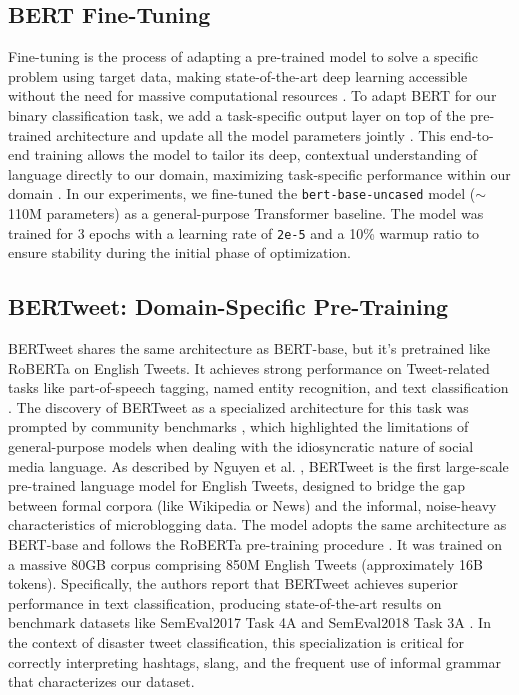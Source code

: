 \documentclass[conference]{IEEEtran}
\begin{document}
\subsection{BERT Fine-Tuning}
Fine-tuning is the process of adapting a pre-trained model to solve a specific problem using target data, making state-of-the-art deep learning accessible without the need for massive computational resources \cite{prof_lecture}. To adapt BERT for our binary classification task, we add a task-specific output layer on top of the pre-trained architecture and update all the model parameters jointly \cite{sun2019how}. This end-to-end training allows the model to tailor its deep, contextual understanding of language directly to our domain, maximizing task-specific performance within our domain \cite{medium_bert}. In our experiments, we fine-tuned the \texttt{bert-base-uncased} model ($\sim$110M parameters) as a general-purpose Transformer baseline. The model was trained for 3 epochs with a learning rate of \texttt{2e-5} and a 10\% warmup ratio to ensure stability during the initial phase of optimization.

\subsection{BERTweet: Domain-Specific Pre-Training}
BERTweet shares the same architecture as BERT-base, but it’s pretrained like RoBERTa on English Tweets. It achieves strong performance on Tweet-related tasks like part-of-speech tagging, named entity recognition, and text classification \cite{huggingface_bertweet}. The discovery of BERTweet as a specialized architecture for this task was prompted by community benchmarks \cite{tripathi_bertweet_kaggle}, which highlighted the limitations of general-purpose models when dealing with the idiosyncratic nature of social media language. As described by Nguyen et al. \cite{nguyen2020bertweet}, BERTweet is the first large-scale pre-trained language model for English Tweets, designed to bridge the gap between formal corpora (like Wikipedia or News) and the informal, noise-heavy characteristics of microblogging data. The model adopts the same architecture as BERT-base and follows the RoBERTa pre-training procedure \cite{nguyen2020bertweet}. It was trained on a massive 80GB corpus comprising 850M English Tweets (approximately 16B tokens). Specifically, the authors report that BERTweet achieves superior performance in text classification, producing state-of-the-art results on benchmark datasets like SemEval2017 Task 4A and SemEval2018 Task 3A \cite{nguyen2020bertweet}. In the context of disaster tweet classification, this specialization is critical for correctly interpreting hashtags, slang, and the frequent use of informal grammar that characterizes our dataset.
\end{document}

